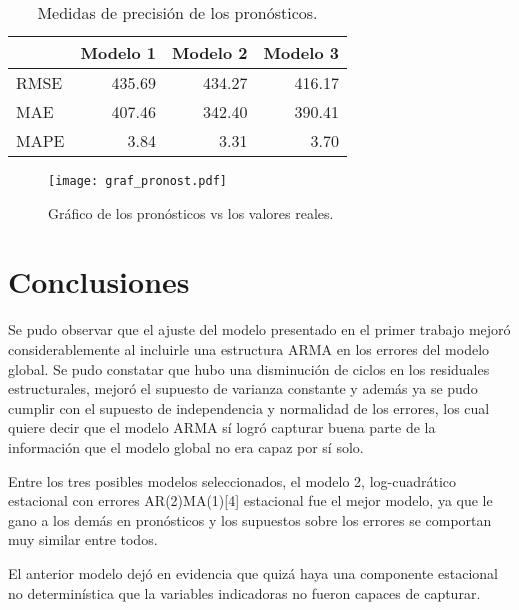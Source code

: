 \documentclass[11pt, letterpaper, twoside]{article}
\begin{document}
\begin{table}[ht]
\caption{Medidas de precisión de los pronósticos.}
\label{tab:medidas_precision}
\centering
\begin{tabular}{lrrr}
& Modelo 1 & Modelo 2 & Modelo 3 \\
\hline
 RMSE & 435.69 & 434.27 & 416.17 \\
 MAE & 407.46 & 342.40 & 390.41 \\
 MAPE & 3.84 & 3.31 & 3.70 \\
\hline
\end{tabular}
\end{table}

\begin{figure}[h]
\centering
\texttt{[image: graf\_pronost.pdf]}
\caption{Gráfico de los pronósticos vs los valores reales.}
\label{fig:graf_pronost}
\end{figure}

\pagebreak

\section*{Conclusiones}

Se pudo observar que el ajuste del modelo presentado en el primer trabajo mejoró considerablemente al incluirle una estructura ARMA en los errores del modelo global. Se pudo constatar que hubo una disminución de ciclos en los residuales estructurales, mejoró el supuesto de varianza constante y además ya se pudo cumplir con el supuesto de independencia y normalidad de los errores, los cual quiere decir que el modelo ARMA sí logró capturar buena parte de la información que el modelo global no era capaz por sí solo.

Entre los tres posibles modelos seleccionados, el modelo 2, log-cuadrático estacional con errores AR(2)MA(1)[4] estacional fue el mejor modelo, ya que le gano a los demás en pronósticos y los supuestos sobre los errores se comportan muy similar entre todos.

El anterior modelo dejó en evidencia que quizá haya una componente estacional no determinística que la variables indicadoras no fueron capaces de capturar.


\printbibliography


\end{document}
